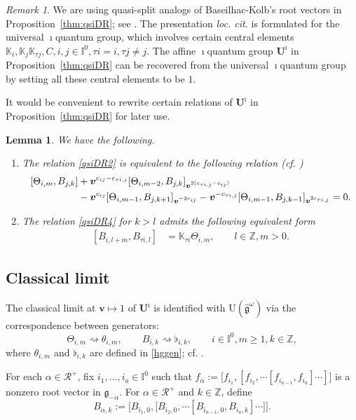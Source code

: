 \documentclass[11pt,reqno]{amsart}
\numberwithin{equation}{section}
\newtheorem{lem}[thm]{Lemma}
\theoremstyle{definition}
\theoremstyle{remark}
\newtheorem{rem}[thm]{Remark}
\newcommand{\beq}{\begin{equation}}
\newcommand{\eeq}{\end{equation}}
\newcommand{\mc}{\mathcal}
\newcommand{\cR}{\mathcal{R}}
\newcommand{\g}{\mathfrak{g}}
\newcommand{\gge}{\geqslant}
\newcommand{\wt}{\widehat}
\newcommand{\rU}{{\mathrm{U}}}
\newcommand{\bv}{{\bm{v}}}
\def \TH{\Theta}
\def \I{\mathbb{I}}
\def \TH{\Theta}
\def \tUi{\mathbf{U}^\imath}
\def \K{\mathbb{K}}
\def \Z{\mathbb{Z}}
\begin{document}
\begin{rem}
We are using quasi-split analogs of Baseilhac-Kolb's root vectors \cite{BK20} in Proposition~\ref{thm:qsiDR}; see \cite[\S 4.4]{LWZ23b}. The presentation {\em loc. cit.} is formulated for the universal $\imath$quantum group, which involves certain central elements $\K_i, \K_j\K_{\tau j}, C, i,j\in \I^0,\tau i=i,\tau j\neq j$. The affine $\imath$quantum group $\tUi$ in Proposition~\ref{thm:qsiDR} can be recovered from the universal $\imath$quantum group by setting all these central elements to be $1$. 
\end{rem}

It would be convenient to rewrite certain relations of $\tUi$ in Proposition~\ref{thm:qsiDR} for later use.

\begin{lem}We have the following.
\begin{enumerate}
    \item The relation \eqref{qsiDR2} is equivalent to the following relation \emph{(}cf. \cite[Lem. 5.4]{LWZ23a}\emph{)}
\begin{align}
\label{qsiA1DR3'}
[\Theta_{i,m},B_{j,k}]&+\bv^{c_{ij}-c_{\tau i,j}}[\Theta_{i,m-2},B_{j,k}]_{\bv^{2(c_{\tau i,j}-c_{ij})}}
\\ \notag
&-\bv^{c_{ij}}[\Theta_{i,m-1},B_{j,k+1}]_{\bv^{-2c_{ij}}}- \bv^{-c_{\tau i, j}}[\Theta_{i,m-1},B_{j,k-1}]_{\bv^{2c_{\tau i,j}}}
=0.
\end{align}
\item The relation \eqref{qsiDR4} for $k>l$ admits the following equivalent form
\begin{align}\label{qsiDR10}
[B_{i,l+m},B_{\tau i,l}]
			&= \K_{\tau i}  \TH_{i,m},\qquad l\in\Z,m>0. 
\end{align}
\end{enumerate}
\end{lem}

\subsection{Classical limit}
The classical limit at $\bv\mapsto 1$ of $\tUi$ is identified with $\rU(\wt{\g}^\omega)$ via the correspondence between generators:
\beq
\TH_{i,m} \rightsquigarrow \theta_{i,m}, \qquad B_{i,k} \rightsquigarrow \flat_{i,k},\qquad i\in\I^0,m\gge 1, k\in\Z,
\eeq
where $\theta_{i,m}$ and $\flat_{i,k}$ are defined in \eqref{hggen}; cf. \cite{Ko14}.

For each $\alpha\in\cR^+$, fix $i_1,\dots,i_a\in\I^0$ such that $f_{\alpha}:=\big[f_{i_1},[f_{i_2},\cdots[f_{i_{a-1}},f_{i_a}]\cdots]\big]$ is a nonzero root vector in $\g_{-\alpha}$. For $\alpha\in\mc R^+$ and $k\in\Z$, define
\beq\label{Bjir1}
B_{\alpha,k}:=\Big[B_{i_1,0},\big[B_{i_2,0},\cdots[B_{i_{a-1},0},B_{i_a,k}]\cdots\big]\Big].
\eeq
\end{document}
